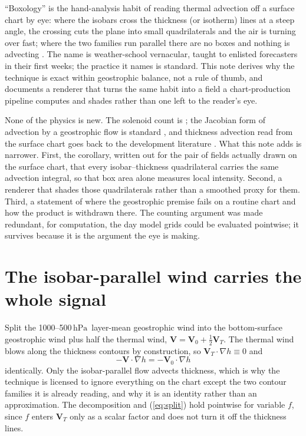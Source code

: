\documentclass[11pt]{article}
\newcommand{\hPa}{\ensuremath{\,\mathrm{hPa}}}
\begin{document}
``Boxology'' is the hand-analysis habit of reading thermal advection off a surface chart by eye: where the isobars cross the thickness (or isotherm) lines at a steep angle, the crossing cuts the plane into small quadrilaterals and the air is turning over fast; where the two families run parallel there are no boxes and nothing is advecting \citep{lackmann2011}. The name is weather-school vernacular, taught to enlisted forecasters in their first weeks; the practice it names is standard. This note derives why the technique is exact within geostrophic balance, not a rule of thumb, and documents a renderer that turns the same habit into a field a chart-production pipeline computes and shades rather than one left to the reader's eye.

None of the physics is new. The solenoid count is \citet{bjerknes1898}; the Jacobian form of advection by a geostrophic flow is standard \citep{holton2013}, and thickness advection read from the surface chart goes back to the development literature \citep{sutcliffe1947,petterssen1956}. What this note adds is narrower. First, the corollary, written out for the pair of fields actually drawn on the surface chart, that every isobar--thickness quadrilateral carries the same advection integral, so that box area alone measures local intensity. Second, a renderer that shades those quadrilaterals rather than a smoothed proxy for them. Third, a statement of where the geostrophic premise fails on a routine chart and how the product is withdrawn there. The counting argument was made redundant, for computation, the day model grids could be evaluated pointwise; it survives because it is the argument the eye is making.

\section{The isobar-parallel wind carries the whole signal}

Split the 1000--500\hPa\ layer-mean geostrophic wind into the bottom-surface geostrophic wind plus half the thermal wind, $\mathbf{V} = \mathbf{V}_0 + \tfrac12 \mathbf{V}_T$. The thermal wind blows along the thickness contours by construction, so $\mathbf{V}_T \cdot \nabla h \equiv 0$ and
\begin{equation}
-\mathbf{V}\cdot\nabla h = -\mathbf{V}_0\cdot\nabla h
\label{eq:split}
\end{equation}
identically. Only the isobar-parallel flow advects thickness, which is why the technique is licensed to ignore everything on the chart except the two contour families it is already reading, and why it is an identity rather than an approximation. The decomposition and (\ref{eq:split}) hold pointwise for variable $f$, since $f$ enters $\mathbf{V}_T$ only as a scalar factor and does not turn it off the thickness lines.
\end{document}
